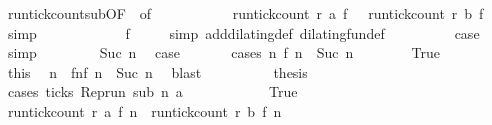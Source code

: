 \begin{isabellebody}
\ run{\isacharunderscore}tick{\isacharunderscore}count{\isacharunderscore}sub{\isacharbrackleft}OF\ {\isacharasterisk}{\isacharcomma}\ of\ {\isacharunderscore}\ {}{\isacharbrackright}\ \isamarkupfalse%
\isanewline
\ \ \ \ \ \ \ \ {\isacartoucheopen}run{\isacharunderscore}tick{\isacharunderscore}count\ r\ a\ {\isacharparenleft}f\ {}{\isacharparenright}\ {\isasymle}\ run{\isacharunderscore}tick{\isacharunderscore}count\ r\ b\ {\isacharparenleft}f\ {}{\isacharparenright}{\isacartoucheclose}\ \isamarkupfalse%
\ simp\isanewline
\ \ \ \ \ \ \isamarkupfalse%
\ \isamarkupfalse%
\ {\isacharasterisk}\ \isamarkupfalse%
\ {\isacartoucheopen}f\ {}\ {\isacharequal}\ {}{\isacartoucheclose}\ \isamarkupfalse%
\ {\isacharparenleft}simp\ add{\isacharcolon}dilating{\isacharunderscore}def\ dilating{\isacharunderscore}fun{\isacharunderscore}def{\isacharparenright}\isanewline
\ \ \ \ \ \ \isamarkupfalse%
\ \isamarkupfalse%
\ {\isacharquery}case\ \isamarkupfalse%
\ simp\isanewline
\ \ \isamarkupfalse%
\isanewline
\ \ \ \ \isamarkupfalse%
\ {\isacharparenleft}Suc\ n{\isacharprime}{\isacharparenright}\ \isamarkupfalse%
\ {\isacharquery}case\ \isanewline
\ \ \ \ \isamarkupfalse%
\ {\isacharparenleft}cases\ {\isacartoucheopen}{\isasymexists}n\ f\ n\ {\isacharequal}\ Suc\ n{\isacharprime}{\isacartoucheclose}{\isacharparenright}\isanewline
\ \ \ \ \ \ \isamarkupfalse%
\ True\isanewline
\ \ \ \ \ \ \ \ \isamarkupfalse%
\ this\ \isamarkupfalse%
\ n\ \ fn{}{\isacharcolon}{\isacartoucheopen}f\ n\ {\isacharequal}\ Suc\ n{\isacharprime}{\isacartoucheclose}\ \isamarkupfalse%
\ blast\isanewline
\ \ \ \ \ \ \ \ \isamarkupfalse%
\ {\isacharquery}thesis\isanewline
\ \ \ \ \ \ \ \ \isamarkupfalse%
\ {\isacharparenleft}cases\ {\isacartoucheopen}ticks\ {\isacharparenleft}{\isacharparenleft}Rep{\isacharunderscore}run\ sub{\isacharparenright}\ n\ a{\isacharparenright}{\isacartoucheclose}{\isacharparenright}\isanewline
\ \ \ \ \ \ \ \ \ \ \isamarkupfalse%
\ True\isanewline
\ \ \ \ \ \ \ \ \ \ \ \ \isamarkupfalse%
\ {\isacartoucheopen}run{\isacharunderscore}tick{\isacharunderscore}count\ r\ a\ {\isacharparenleft}f\ n\ {\isasymle}\ run{\isacharunderscore}tick{\isacharunderscore}count\ r\ b\ {\isacharparenleft}f\ n\isanewline

\end{isabellebody}

